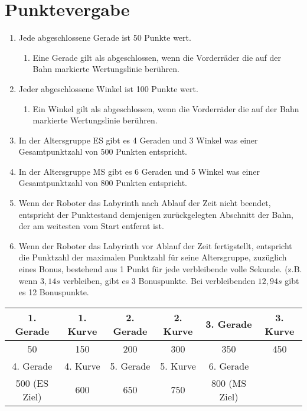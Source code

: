 \documentclass[a4paper,12pt]{article}
\begin{document}
\section{Punktevergabe}
\begin{enumerate}
	\item Jede abgeschlossene Gerade ist 50 Punkte wert.
	\begin{enumerate}
		\item Eine Gerade gilt als abgeschlossen, wenn die Vorderräder
			die auf der Bahn markierte Wertungslinie berühren.
	\end{enumerate}
	\item Jeder abgeschlossene Winkel ist 100 Punkte wert.
	\begin{enumerate}
		\item Ein Winkel gilt als abgeschlossen, wenn die Vorderräder
			die auf der Bahn markierte Wertungslinie berühren.
	\end{enumerate}
	\item In der Altersgruppe ES gibt es 4 Geraden und 3 Winkel was einer
		Gesamtpunktzahl von 500 Punkten entspricht.
	\item In der Altersgruppe MS gibt es 6 Geraden und 5 Winkel was einer
		Gesamtpunktzahl von 800 Punkten entspricht.
	\item Wenn der Roboter das Labyrinth nach Ablauf der Zeit nicht
		beendet, entspricht der Punktestand demjenigen zurückgelegten
		Abschnitt der Bahn, der am weitesten vom Start entfernt ist.
	\item Wenn der Roboter das Labyrinth vor Ablauf der Zeit fertigstellt,
		entspricht die Punktzahl der maximalen Punktzahl für seine
		Altersgruppe, zuzüglich eines Bonus, bestehend aus 1 Punkt für
		jede verbleibende volle Sekunde. (z.B. wenn $3,14s$ verbleiben,
		gibt es 3 Bonuspunkte. Bei verbleibenden $12,94s$ gibt es 12
		Bonuspunkte.
\end{enumerate}
\begin{center}
	\begin{tabular}{|c|c|c|c|c|c|} \hline
		\rowcolor{Gray}
		1. Gerade & 1. Kurve & 2. Gerade & 2. Kurve & 3. Gerade & 3. Kurve  \\ \hline
		50 & 150 & 200 & 300 & 350 & 450  \\ \hline
		\rowcolor{Gray}
		4. Gerade & 4. Kurve & 5. Gerade & 5. Kurve & 6. Gerade & \\ \hline
		500 (ES Ziel) & 600 & 650 & 750 & 800 (MS Ziel) & \\ \hline
	\end{tabular}
\end{center}
\end{document}

